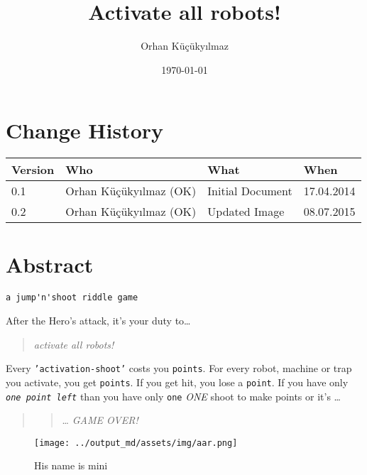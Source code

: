 \documentclass[twopages]{scrartcl}
\begin{document}
\title{Activate all robots!}
\author{Orhan Küçükyılmaz}
\date{\today}
\maketitle
\newpage
\tableofcontents

\section*{Change History}

\begin{longtable}{|l|l|l|l|}
\hline
Version & Who & What & When\\
\hline
0.1 & Orhan Küçükyılmaz (OK) & Initial Document & 17.04.2014\\
0.2 & Orhan Küçükyılmaz (OK) & Updated Image & 08.07.2015\\
\hline
\end{longtable}

\section*{Abstract}

\begin{verbatim}a jump'n'shoot riddle game
\end{verbatim}

After the Hero's attack, it's your duty to\ldots{}

\begin{quote}
\emph{activate all robots!}
\end{quote}

Every \texttt{'activation-shoot'} costs you \texttt{points}.\newline
For every robot, machine or trap you activate,\newline
you get \texttt{points}.\newline
If you get hit, you lose a \texttt{point}.\newline
If you have only \emph{\texttt{one point left}}\newline
than you have only \texttt{one} \emph{ONE} shoot to make points or it's \ldots{}

\begin{quote}
\begin{quote}
\ldots{} \emph{GAME OVER!}
\end{quote}
\end{quote}

\begin{figure}
\begin{center}
\texttt{[image: ../output\_md/assets/img/aar.png]}
\end{center}
\caption{ His name is mini }

\end{figure}
\end{document}
